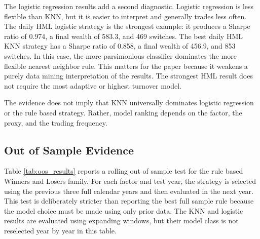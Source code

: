 \documentclass[investment,article,submit,pdftex,moreauthors]{Definitions/mdpi}
\begin{document}
The logistic regression results add a second diagnostic. Logistic regression is less flexible than KNN, but it is easier to interpret and generally trades less often. The daily HML logistic strategy is the strongest example: it produces a Sharpe ratio of 0.974, a final wealth of 583.3, and 469 switches. The best daily HML KNN strategy has a Sharpe ratio of 0.858, a final wealth of 456.9, and 853 switches. In this case, the more parsimonious classifier dominates the more flexible nearest neighbor rule. This matters for the paper because it weakens a purely data mining interpretation of the results. The strongest HML result does not require the most adaptive or highest turnover model.

The evidence does not imply that KNN universally dominates logistic regression or the rule based strategy. Rather, model ranking depends on the factor, the proxy, and the trading frequency.

\subsection{Out of Sample Evidence}

Table \ref{tab:oos_results} reports a rolling out of sample test for the rule based Winners and Losers family. For each factor and test year, the strategy is selected using the previous three full calendar years and then evaluated in the next year. This test is deliberately stricter than reporting the best full sample rule because the model choice must be made using only prior data. The KNN and logistic results are evaluated using expanding windows, but their model class is not reselected year by year in this table.

\begin{table}[H]
\centering
\caption{Out of sample strategy performance}
\label{tab:oos_results}
\scriptsize
{}
\end{table}
\end{document}

